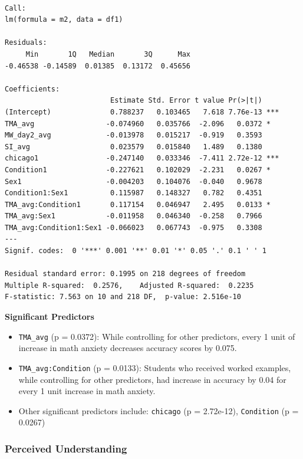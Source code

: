 \documentclass[
  letterpaper,
  DIV=11,
  numbers=noendperiod]{scrartcl}
\begin{document}
\begin{verbatim}

Call:
lm(formula = m2, data = df1)

Residuals:
     Min       1Q   Median       3Q      Max 
-0.46538 -0.14589  0.01385  0.13172  0.45656 

Coefficients:
                         Estimate Std. Error t value Pr(>|t|)    
(Intercept)              0.788237   0.103465   7.618 7.76e-13 ***
TMA_avg                 -0.074960   0.035766  -2.096   0.0372 *  
MW_day2_avg             -0.013978   0.015217  -0.919   0.3593    
SI_avg                   0.023579   0.015840   1.489   0.1380    
chicago1                -0.247140   0.033346  -7.411 2.72e-12 ***
Condition1              -0.227621   0.102029  -2.231   0.0267 *  
Sex1                    -0.004203   0.104076  -0.040   0.9678    
Condition1:Sex1          0.115987   0.148327   0.782   0.4351    
TMA_avg:Condition1       0.117154   0.046947   2.495   0.0133 *  
TMA_avg:Sex1            -0.011958   0.046340  -0.258   0.7966    
TMA_avg:Condition1:Sex1 -0.066023   0.067743  -0.975   0.3308    
---
Signif. codes:  0 '***' 0.001 '**' 0.01 '*' 0.05 '.' 0.1 ' ' 1

Residual standard error: 0.1995 on 218 degrees of freedom
Multiple R-squared:  0.2576,    Adjusted R-squared:  0.2235 
F-statistic: 7.563 on 10 and 218 DF,  p-value: 2.516e-10
\end{verbatim}

\textbf{Significant Predictors}

\begin{itemize}
\item
  \texttt{TMA\_avg} (p = 0.0372): While controlling for other
  predictors, every 1 unit of increase in math anxiety decreases
  accuracy scores by 0.075.
\item
  \texttt{TMA\_avg:Condition} (p = 0.0133): Students who received worked
  examples, while controlling for other predictors, had increase in
  accuracy by 0.04 for every 1 unit increase in math anxiety.
\item
  Other significant predictors include: \texttt{chicago} (p = 2.72e-12),
  \texttt{Condition} (p = 0.0267)
\end{itemize}

\hypertarget{perceived-understanding}{%
\subsubsection{Perceived Understanding}\label{perceived-understanding}}
\end{document}
